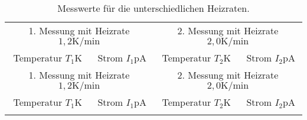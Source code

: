 \begin{longtable}{c c ||c c}
  \caption{Messwerte für die unterschiedlichen Heizraten.}
 \label{tab:messwerte}\\
 \toprule
\multicolumn{2}{c}{1. Messung mit Heizrate $1,2 \si{\kelvin\per\minute}$ }  &  \multicolumn{2}{c}{2. Messung mit Heizrate $2,0 \si{\kelvin\per\minute}$ }\\
   Temperatur $T_1 \si{\kelvin}$ &   Strom $I_1 \si{\pico\ampere}$ &   Temperatur $T_2 \si{\kelvin}$ &   Strom $I_2 \si{\pico\ampere}$ \\
\midrule
\endfirsthead
\hline
\multicolumn{2}{c}{1. Messung mit Heizrate $1,2 \si{\kelvin\per\minute}$ }  &  \multicolumn{2}{c}{2. Messung mit Heizrate $2,0 \si{\kelvin\per\minute}$ }\\
   Temperatur $T_1 \si{\kelvin}$ &   Strom $I_1 \si{\pico\ampere}$ &   Temperatur $T_2 \si{\kelvin}$ &   Strom $I_2 \si{\pico\ampere}$ \\
\midrule
\endhead
\hline
\endfoot
\bottomrule
\endlastfoot


\end{longtable}
